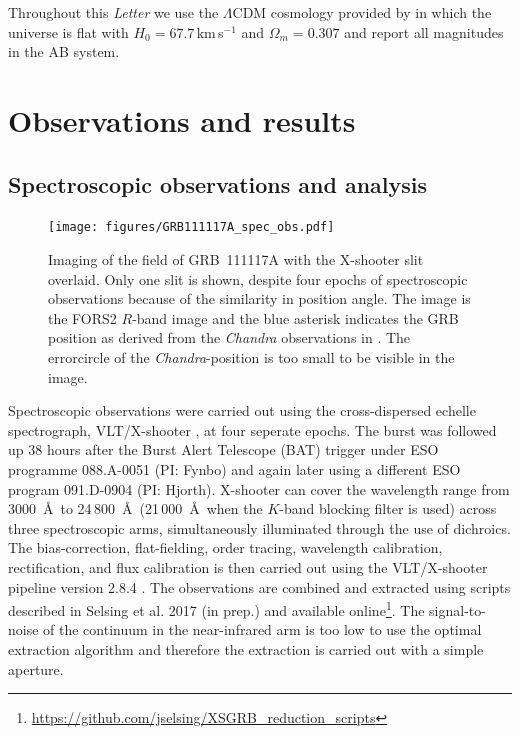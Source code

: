 \documentclass{aa}    %
\begin{document}
Throughout this \emph{Letter} we use the $\Lambda$CDM cosmology provided by
\citet{Planck2015} in which the universe is flat with $H_0 = 67.7$\,km\,s$^{-1}$
and $\Omega_m = 0.307$ and report all magnitudes in the AB system.


\section{Observations and results}

\subsection{Spectroscopic observations and analysis}

\begin{figure}
	\centering
	\texttt{[image: figures/GRB111117A\_spec\_obs.pdf]}
	\caption{Imaging of the field of GRB~111117A with the X-shooter slit overlaid. Only one slit is shown, despite four epochs of spectroscopic observations because of the similarity in position angle. The image is the FORS2 $R$-band image and%
	the blue asterisk indicates the GRB position as derived from the \emph{Chandra} observations in \citet{Sakamoto2013}. The errorcircle of the \emph{Chandra}-position is too small to be visible in the image.}
	\label{fig:spec_setup}
\end{figure}


Spectroscopic observations were carried out using the cross-dispersed echelle
spectrograph, VLT/X-shooter \citep{Vernet2011}, at four seperate epochs. The
burst was followed up 38 hours after the Burst Alert Telescope (BAT) trigger
under ESO programme 088.A-0051 (PI: Fynbo) and again later using a different ESO
program 091.D-0904 (PI: Hjorth). X-shooter can cover the wavelength range from
3000~\AA~to 24\,800~\AA~(21\,000~\AA~when the $K$-band blocking filter is used) across
three spectroscopic arms, simultaneously illuminated through the use of
dichroics. The bias-correction, flat-fielding, order tracing, wavelength
calibration, rectification, and flux calibration is then carried out using the
VLT/X-shooter pipeline version 2.8.4 \citep{Modigliani2010}. 
The observations are combined and extracted using scripts described in Selsing
et al. 2017 (in prep.) and available
online\footnote{\url{https://github.com/jselsing/XSGRB_reduction_scripts}}. The
signal-to-noise of the continuum in the near-infrared arm is too low to use the
optimal extraction algorithm \citep{Horne1986} and therefore the extraction is
carried out with a simple aperture.
\end{document}
